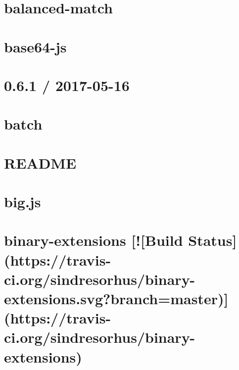 \documentclass[twoside]{book}
\newcommand{\+}{\discretionary{\mbox{\scriptsize$\hookleftarrow$}}{}{}}
\begin{document}
\chapter{balanced-\/match}
\label{md__c_1_workspace_demo_src_main_script_node_modules_balanced-match__r_e_a_d_m_e}

\chapter{base64-\/js}
\label{md__c_1_workspace_demo_src_main_script_node_modules_base64-js__r_e_a_d_m_e}

\chapter{0.6.1 / 2017-\/05-\/16}
\label{md__c_1_workspace_demo_src_main_script_node_modules_batch__history}

\chapter{batch}
\label{md__c_1_workspace_demo_src_main_script_node_modules_batch__readme}

\chapter{R\+E\+A\+D\+ME}
\label{md__c_1_workspace_demo_src_main_script_node_modules_bcrypt-pbkdf__r_e_a_d_m_e}

\chapter{big.\+js}
\label{md__c_1_workspace_demo_src_main_script_node_modules_big_8js__r_e_a_d_m_e}

\chapter{binary-\/extensions \mbox{[}!\mbox{[}Build Status\mbox{]}(https\+://travis-\/ci.org/sindresorhus/binary-\/extensions.svg?branch=master)\mbox{]}(https\+://travis-\/ci.org/sindresorhus/binary-\/extensions)}
\label{md__c_1_workspace_demo_src_main_script_node_modules_binary-extensions_readme}

\end{document}
